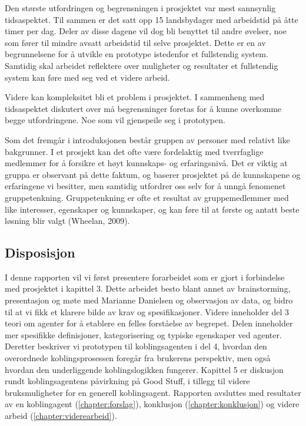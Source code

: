 Den største utfordringen og begrensningen i prosjektet var mest sannsynlig tidsaspektet. Til sammen er det satt opp 15 landsbydager med arbeidstid på åtte timer per dag. Deler av disse dagene vil dog bli benyttet til andre øvelser, noe som fører til mindre avsatt arbeidstid til selve prosjektet. Dette er en av begrunnelsene for å utvikle en prototype istedenfor et fullstendig system. Samtidig skal arbeidet reflektere over muligheter og resultater et fullstendig system kan føre med seg ved et videre arbeid.

Videre kan kompleksitet bli et problem i prosjektet. I sammenheng med tidsaspektet diskutert over må begrensninger foretas for å kunne overkomme begge utfordringene. Noe som vil gjenspeile seg i prototypen.

Som det fremgår i introduksjonen består gruppen av personer med relativt like bakgrunner. I et prosjekt kan det ofte være fordelaktig med tverrfaglige medlemmer for å forsikre et høyt kunnskaps- og erfaringsnivå. Det er viktig at gruppa er observant på dette faktum, og baserer prosjektet på de kunnskapene og erfaringene vi besitter, men samtidig utfordrer oss selv for å unngå fenomenet gruppetenkning. Gruppetenkning er ofte et resultat av gruppemedlemmer med like interesser, egenskaper og kunnskaper, og kan føre til at første og antatt beste løsning blir valgt (Wheelan, 2009)\cite{effectiveTeams}.

\subsection{Disposisjon}

I denne rapporten vil vi først presentere forarbeidet som er gjort i forbindelse med prosjektet i kapittel 3. Dette arbeidet besto blant annet av brainstorming, presentasjon og møte med Marianne Danielsen og observasjon av data, og bidro til at vi fikk et klarere bilde av krav og spesifikasjoner. Videre inneholder del 3 teori om agenter for å etablere en felles forståelse av begrepet. Delen inneholder mer spesifikke definisjoner, kategorisering og typiske egenskaper ved agenter. Deretter beskriver vi prototypen til koblingsagenten i del 4, hvordan den overordnede koblingsprosessen foregår fra brukerens perspektiv, men også hvordan den underliggende koblingslogikken fungerer. Kapittel 5 er diskusjon rundt koblingsagentens påvirkning på Good Stuff, i tillegg til videre bruksmuligheter for en generell koblingsagent. Rapporten avsluttes med resultater av en koblingagent (\ref{chapter:forslag}), konklusjon (\ref{chapter:konklusjon}) og videre arbeid (\ref{chapter:viderearbeid}).
